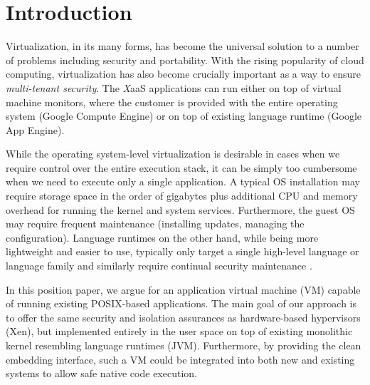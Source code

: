 \section{Introduction}
\label{sec:intro}



Virtualization, in its many forms, has become the universal solution to
a number of problems including security and portability.  With the
rising popularity of cloud computing, virtualization has also become
crucially important as a way to ensure \emph{multi-tenant security}. The
\emph{X}aaS applications can run either on top of virtual machine
monitors, where the customer is provided with the entire operating
system (\eg Google Compute Engine) or on top of existing language
runtime (\eg Google App Engine).

While the operating system-level virtualization is desirable in cases
when we require control over the entire execution stack, it can be
simply too cumbersome when we need to execute only a single
application.  A typical OS installation may require storage space in
the order of gigabytes plus additional CPU and memory overhead for
running the kernel and system services. Furthermore, the guest OS may
require frequent maintenance (\eg installing updates, managing the
configuration).  Language runtimes on the other hand, while being more
lightweight and easier to use, typically only target a single high-level
language or language family and similarly require continual security
maintenance \cite{java0day2013}.

In this position paper, we argue for an application virtual machine (VM)
capable of running existing POSIX-based applications. The main goal of
our approach is to offer the same security and isolation assurances as
hardware-based hypervisors (\eg Xen), but implemented entirely in the
user space on top of existing monolithic kernel resembling language
runtimes (\eg JVM). Furthermore, by providing the clean embedding
interface, such a VM could be integrated into both new and existing
systems to allow safe native code execution.

